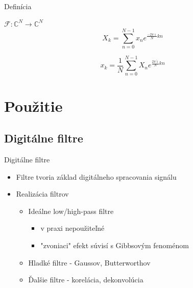 \documentclass{beamer}
\def\imag{\hat{\imath}}
\def\sipka{\rightarrow}
\def\C{\mathbb{C}}
\begin{document}
\begin{frame}{Definícia}
    \begin{definition}
    $\mathcal{F}:\C^N\sipka\C^N$
        \begin{equation*}
            X_k = \sum_{n=0}^{N-1} x_n e^{\frac{-2\pi\imag}{N} k n}
        \end{equation*}
    \end{definition}
    \begin{definition}
        \begin{equation*}
            x_k = \frac{1}{N} \sum_{n=0}^{N-1} X_n e^{\frac{2\pi\imag}{N} kn}
        \end{equation*}
    \end{definition}
\end{frame}

\section{Použitie}
\subsection{Digitálne filtre}
\begin{frame}{Digitálne filtre}
    \begin{itemize}
        \item Filtre tvoria základ digitálneho spracovania signálu
        \item Realizácia filtrov
            \begin{itemize}
                \item Ideálne low/high-pass filtre
                    \begin{itemize}
                    \item v praxi nepoužiteľné
                    \item "zvoniaci" efekt súvisí s Gibbsovým fenoménom
                    \end{itemize}
                \item Hladké filtre - Gaussov, Butterworthov
                \item Ďalšie filtre - korelácia, dekonvolúcia
            \end{itemize}
    \end{itemize}
\end{frame}
\end{document}
